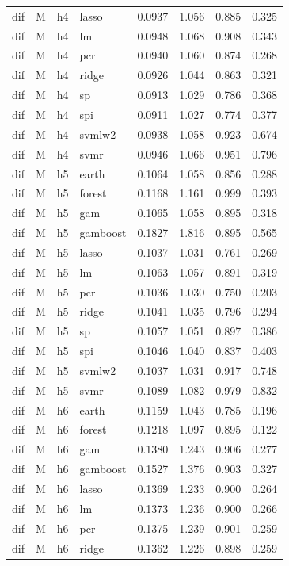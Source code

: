 \begin{ThreePartTable}
\begin{longtable}[t]{llclcccc}
dif & M & h4 & lasso & 0.0937 & 1.056 & 0.885 & 0.325\\
dif & M & h4 & lm & 0.0948 & 1.068 & 0.908 & 0.343\\
dif & M & h4 & pcr & 0.0940 & 1.060 & 0.874 & 0.268\\
dif & M & h4 & ridge & 0.0926 & 1.044 & 0.863 & 0.321\\
dif & M & h4 & sp & 0.0913 & 1.029 & 0.786 & 0.368\\
dif & M & h4 & spi & 0.0911 & 1.027 & 0.774 & 0.377\\
dif & M & h4 & svmlw2 & 0.0938 & 1.058 & 0.923 & 0.674\\
dif & M & h4 & svmr & 0.0946 & 1.066 & 0.951 & 0.796\\
\addlinespace
dif & M & h5 & earth & 0.1064 & 1.058 & 0.856 & 0.288\\
dif & M & h5 & forest & 0.1168 & 1.161 & 0.999 & 0.393\\
dif & M & h5 & gam & 0.1065 & 1.058 & 0.895 & 0.318\\
dif & M & h5 & gamboost & 0.1827 & 1.816 & 0.895 & 0.565\\
dif & M & h5 & lasso & 0.1037 & 1.031 & 0.761 & 0.269\\
dif & M & h5 & lm & 0.1063 & 1.057 & 0.891 & 0.319\\
dif & M & h5 & pcr & 0.1036 & 1.030 & 0.750 & 0.203\\
dif & M & h5 & ridge & 0.1041 & 1.035 & 0.796 & 0.294\\
dif & M & h5 & sp & 0.1057 & 1.051 & 0.897 & 0.386\\
dif & M & h5 & spi & 0.1046 & 1.040 & 0.837 & 0.403\\
dif & M & h5 & svmlw2 & 0.1037 & 1.031 & 0.917 & 0.748\\
dif & M & h5 & svmr & 0.1089 & 1.082 & 0.979 & 0.832\\
\addlinespace
dif & M & h6 & earth & 0.1159 & 1.043 & 0.785 & 0.196\\
dif & M & h6 & forest & 0.1218 & 1.097 & 0.895 & 0.122\\
dif & M & h6 & gam & 0.1380 & 1.243 & 0.906 & 0.277\\
dif & M & h6 & gamboost & 0.1527 & 1.376 & 0.903 & 0.327\\
dif & M & h6 & lasso & 0.1369 & 1.233 & 0.900 & 0.264\\
dif & M & h6 & lm & 0.1373 & 1.236 & 0.900 & 0.266\\
dif & M & h6 & pcr & 0.1375 & 1.239 & 0.901 & 0.259\\
dif & M & h6 & ridge & 0.1362 & 1.226 & 0.898 & 0.259\\

\end{longtable}
\end{ThreePartTable}
